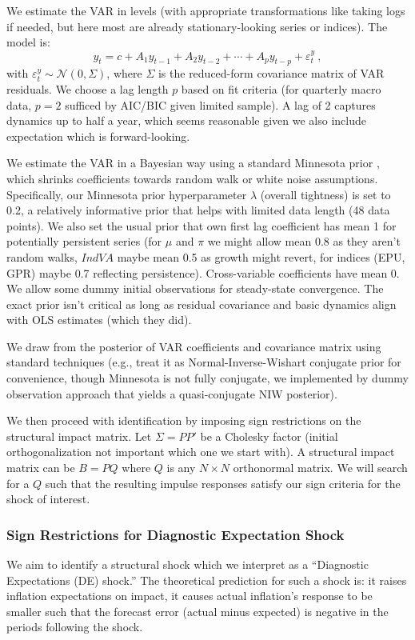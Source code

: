 \documentclass[12pt]{article}
\begin{document}
We estimate the VAR in levels (with appropriate transformations like taking logs if needed, but here most are already stationary-looking series or indices). The model is:
\[
    y_t = c + A_1 y_{t-1} + A_2 y_{t-2} + \cdots + A_p y_{t-p} + \varepsilon^y_t~,
\]
with $\varepsilon^y_t \sim \mathcal{N}(0,\Sigma)$, where $\Sigma$ is the reduced-form covariance matrix of VAR residuals. We choose a lag length $p$ based on fit criteria (for quarterly macro data, $p=2$ sufficed by AIC/BIC given limited sample). A lag of 2 captures dynamics up to half a year, which seems reasonable given we also include expectation which is forward-looking.

We estimate the VAR in a Bayesian way using a standard Minnesota prior \cite{Litterman1986}, which shrinks coefficients towards random walk or white noise assumptions. Specifically, our Minnesota prior hyperparameter $\lambda$ (overall tightness) is set to 0.2, a relatively informative prior that helps with limited data length (48 data points). We also set the usual prior that own first lag coefficient has mean 1 for potentially persistent series (for $\mu$ and $\pi$ we might allow mean 0.8 as they aren't random walks, $IndVA$ maybe mean 0.5 as growth might revert, for indices (EPU, GPR) maybe 0.7 reflecting persistence). Cross-variable coefficients have mean 0. We allow some dummy initial observations for steady-state convergence. The exact prior isn't critical as long as residual covariance and basic dynamics align with OLS estimates (which they did).

We draw from the posterior of VAR coefficients and covariance matrix using standard techniques (e.g., treat it as Normal-Inverse-Wishart conjugate prior for convenience, though Minnesota is not fully conjugate, we implemented by dummy observation approach that yields a quasi-conjugate NIW posterior).

We then proceed with identification by imposing sign restrictions on the structural impact matrix. Let $\Sigma = PP'$ be a Cholesky factor (initial orthogonalization not important which one we start with). A structural impact matrix can be $B = P Q$ where $Q$ is any $N\times N$ orthonormal matrix. We will search for a $Q$ such that the resulting impulse responses satisfy our sign criteria for the shock of interest.

\subsubsection{Sign Restrictions for Diagnostic Expectation Shock}
We aim to identify a structural shock which we interpret as a “Diagnostic Expectations (DE) shock.” The theoretical prediction for such a shock is: it raises inflation expectations on impact, it causes actual inflation's response to be smaller such that the forecast error (actual minus expected) is negative in the periods following the shock.
\end{document}
